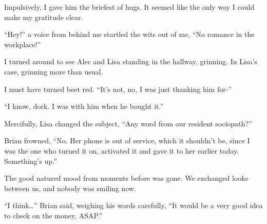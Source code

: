 Impulsively, I gave him the briefest of hugs.  It seemed like the only way I could make my gratitude clear.



``Hey!'' a voice from behind me startled the wits out of me, ``No romance in the workplace!''



I turned around to see Alec and Lisa standing in the hallway, grinning.  In Lisa's case, grinning more than usual.



I must have turned beet red.  ``It's not, no, I was just thanking him for-''



``I know, dork.  I was with him when he bought it.''



Mercifully, Lisa changed the subject, ``Any word from our resident sociopath?''



Brian frowned, ``No.  Her phone is out of service, which it shouldn't be, since I was the one who turned it on, activated it and gave it to her earlier today.  Something's up.''



The good natured mood from moments before was gone.  We exchanged looks between us, and nobody was smiling now.



``I think\ldots'' Brian said, weighing his words carefully, ``It would be a very good idea to check on the money, ASAP.''






